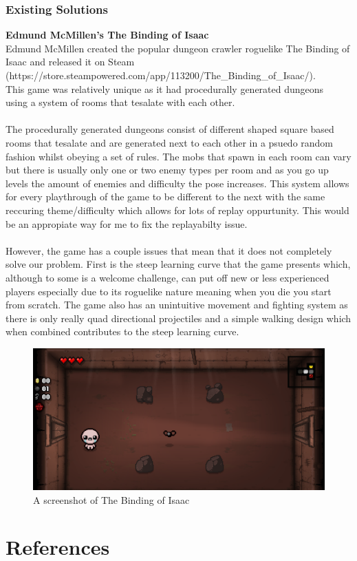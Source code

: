\documentclass{article}
\begin{document}
        \subsubsection{Existing Solutions}
        \textbf{Edmund McMillen's The Binding of Isaac}\\
        Edmund McMillen created the popular dungeon crawler roguelike The Binding of Isaac and released it on Steam (https://store.steampowered.com/app/113200/The\_Binding\_of\_Isaac/).\\
        This game was relatively unique as it had procedurally generated dungeons \\using a system of rooms that tesalate with each other.\\
        \\
        The procedurally generated dungeons consist of different shaped square based rooms that tesalate and are generated next to each other in a psuedo random fashion whilst obeying a set of rules. The mobs that spawn in each room can vary but there is usually only one or two enemy types per room and as you go up levels the amount of enemies and difficulty the pose increases. This system allows for every playthrough of the game to be different to the next with the same reccuring theme/difficulty which allows for lots of replay oppurtunity. This would be an appropiate way for me to fix the replayabilty issue.\\
        \\
        However, the game has a couple issues that mean that it does not completely solve our problem. First is the steep learning curve that the game presents which, although to some is a welcome challenge, can put off new or less experienced players especially due to its roguelike nature meaning when you die you start from scratch. The game also has an unintuitive movement and fighting system as there is only really quad directional projectiles and a simple walking design which when combined contributes to the steep learning curve.\\
        \begin{figure}[h]
                \centering
                \includegraphics[scale=0.25]{images/research/BOI_Capture.PNG}
                \caption{A screenshot of The Binding of Isaac}
                \label{fig:ie_0}
        \end{figure}
\newpage
\pagestyle{plain}
\section{References}
\end{document}
